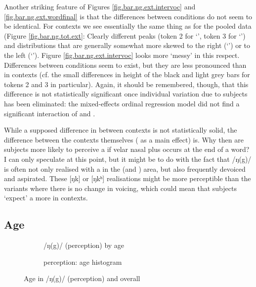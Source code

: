 Another striking feature of Figures \ref{fig.bar.ng.ext.intervoc} and \ref{fig.bar.ng.ext.wordfinal} is that the differences between  conditions do not seem to be identical.
For  contexts we see essentially the same thing as for the pooled data (Figure \ref{fig.bar.ng.tot.ext}: Clearly different peaks (token 2 for `', token 3 for `') and distributions that are generally somewhat more skewed to the right (`') or to the left (`').
Figure \ref{fig.bar.ng.ext.intervoc} looks more `messy' in this respect.
Differences between  conditions seem to exist, but they are less pronounced than in  contexts (cf. the small differences in height of the black and light grey bars for tokens 2 and 3 in particular).
Again, it should be remembered, though, that this difference is not statistically significant once individual variation due to subjects has been eliminated: the mixed-effects ordinal regression model did not find a significant interaction of  and .

While a supposed difference in  between contexts is not statistically solid, the difference between the contexts themselves ( as a main effect) is.
Why then are subjects more likely to perceive a  if velar nasal plus occurs at the end of a word?
I can only speculate at this point, but it might be to do with the fact that  /ŋ(g)/ is often not only realised with a  in the  (and ) area, but also frequently devoiced and aspirated.
These [ŋk] or [ŋkʰ] realisations might be more perceptible than the  variants where there is no change in voicing, which could mean that subjects `expect' a  more in  contexts.

\subsection{Age}
\label{sec.perc_res.ng.age}

\begin{figure}[h]
	\centering
	\begin{subfigure}{.49\textwidth}
		\centering
			\resizebox{\linewidth}{!}{} 
		\caption{/ŋ(g)/ (perception)  by age}
		\label{fig.scatter.ng.ext.age}
	\end{subfigure}
	\begin{subfigure}{.49\textwidth}
		\centering
			\resizebox{\linewidth}{!}{} 
		\caption{perception: age histogram}
		\label{fig.hist.ext.age}
	\end{subfigure}			
	\caption{Age in /ŋ(g)/ (perception) and overall}
\end{figure}

